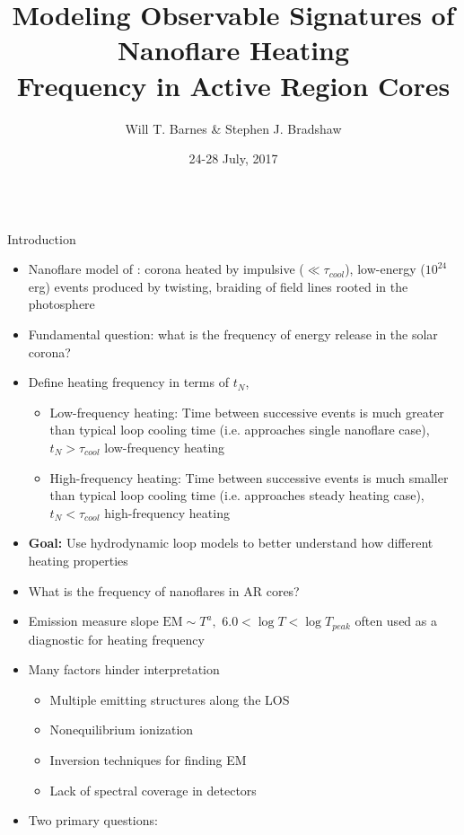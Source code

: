 \documentclass[final]{beamer}
\title[Observable Signatures of Nanoflares]{Modeling Observable Signatures of Nanoflare Heating\\Frequency in Active Region Cores}
\author[Barnes \& Bradshaw]{Will T. Barnes \& Stephen J. Bradshaw}
\institute[Rice University]{Department of Physics and Astronomy\\Rice University}
\date{24-28 July, 2017}
\begin{document}
\begin{frame}
  \begin{columns}[T]
  \hfill
  \begin{column}{0.49\linewidth}
    \begin{block}{Introduction}
    \vspace{-1ex}
    \begin{itemize}
      \item Nanoflare model of \citet{parker_nanoflares_1988}: corona heated by impulsive ($\ll\tau_{cool}$), low-energy ($10^{24}$ erg) events produced by twisting, braiding of field lines rooted in the photosphere
      \item Fundamental question: \alert{what is the frequency of energy release in the solar corona?}
      \item Define heating frequency in terms of $t_N$,      
      \begin{itemize}
        \item Low-frequency heating: Time between successive events is much greater than typical loop cooling time (i.e. approaches single nanoflare case), $t_N>\tau_{cool}$ low-frequency heating
        \item High-frequency heating: Time between successive events is much smaller than typical loop cooling time (i.e. approaches steady heating case), $t_N<\tau_{cool}$ high-frequency heating
      \end{itemize}
      \item \textbf{Goal:} \alert{Use hydrodynamic loop models to better understand how different heating properties}
      \item What is the frequency of nanoflares in AR cores?
      \item Emission measure slope $\mathrm{EM}\sim T^a,\,\,6.0<\log{T}<\log{T_{peak}}$ often used as a diagnostic for heating frequency
      \item Many factors hinder interpretation
      \begin{itemize}
        \item Multiple emitting structures along the LOS
        \item Nonequilibrium ionization
        \item Inversion techniques for finding EM
        \item Lack of spectral coverage in detectors
      \end{itemize}
      \item Two primary questions:

\end{itemize}
\end{block}
\end{column}
\end{columns}
\end{frame}
\end{document}
